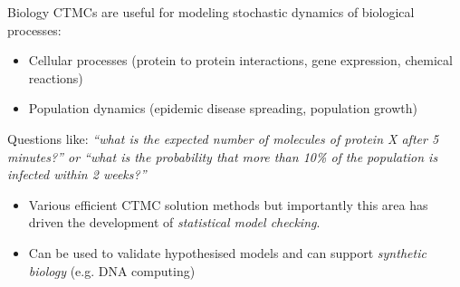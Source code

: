 \documentclass[dvipsnames]{beamer}
\begin{document}

\begin{frame}{Biology}
    CTMCs are useful for modeling stochastic dynamics of biological processes:

    \begin{itemize}
        \item Cellular processes (protein to protein interactions, gene expression, chemical reactions)
        \item Population dynamics (epidemic disease spreading, population growth)
    \end{itemize}

    Questions like: {\textit{ “what is the expected number of molecules of protein X after 5 minutes?” or
        “what is the probability that more than 10\% of the population is infected within
        2 weeks?”}}
    \begin{itemize}
        \item Various efficient CTMC solution methods but importantly this area has driven
              the development of {\it{statistical model checking}}.
        \item Can be used to validate hypothesised models and can support {\it{synthetic biology}} (e.g. DNA computing)
    \end{itemize}





\end{frame}







\end{document}
